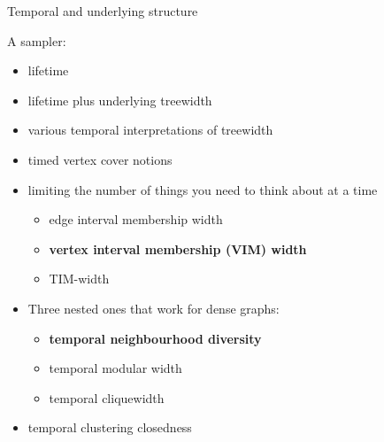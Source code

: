 \documentclass[10pt, compress]{beamer}
\begin{document}
\begin{frame}{Temporal and underlying structure}

A sampler:
\begin{itemize}
    \item lifetime 
    \item lifetime plus underlying treewidth
    \item various temporal interpretations of treewidth
    \item timed vertex cover notions
    \item limiting the number of things you need to think about at a time
    \begin{itemize}
    \item edge interval membership width
    \item \textbf{vertex interval membership (VIM) width}
    \item TIM-width
    \end{itemize}
    \item Three nested ones that work for dense graphs:
    \begin{itemize}
    \item \textbf{temporal neighbourhood diversity}
    \item temporal modular width
    \item temporal cliquewidth
    \end{itemize}
    \item temporal clustering closedness
    
\end{itemize}






\end{frame}
\end{document}

